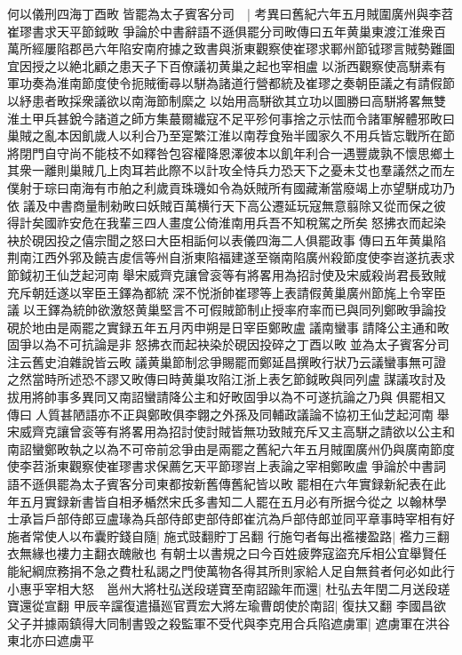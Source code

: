 何以儀刑四海丁酉畋皆罷為太子賓客分司　|{
	考異曰舊紀六年五月賊圍廣州與李苕崔璆書求天平節鉞畋爭論於中書辭語不遜俱罷分司畋傳曰五年黄巢東渡江淮衆百萬所經屢陷郡邑六年陷安南府據之致書與浙東觀察使崔璆求鄆州節钺璆言賊勢難圖宜因授之以絶北顧之患天子下百僚議初黄巢之起也宰相盧以浙西觀察使高駢素有軍功奏為淮南節度使令扼賊衝尋以駢為諸道行營都統及崔璆之奏朝臣議之有請假節以紓患者畋採衆議欲以南海節制縻之以始用高駢欲其立功以圖勝曰高駢將畧無雙淮土甲兵甚銳今諸道之師方集蕞爾纎寇不足平殄何事捨之示怯而令諸軍解體邪畋曰巢賊之亂本因飢歲人以利合乃至寔繁江淮以南荐食殆半國家久不用兵皆忘戰所在節將閉門自守尚不能枝不如釋咎包容權降恩澤彼本以飢年利合一遇豐歲孰不懷思鄉土其衆一離則巢賊几上肉耳若此際不以計攻全恃兵力恐天下之憂未艾也羣議然之而左僕射于琮曰南海有市舶之利歲貢珠璣如令為妖賊所有國藏漸當廢竭上亦望駢成功乃依議及中書商量制勑畋曰妖賊百萬横行天下高公遷延玩寇無意翦除又從而保之彼得計矣國祚安危在我輩三四人畫度公倚淮南用兵吾不知稅駕之所矣怒拂衣而起染袂於硯因投之僖宗聞之怒曰大臣相詬何以表儀四海二人俱罷政事傳曰五年黄巢陷荆南江西外郛及饒吉䖍信等州自浙東陷福建遂至嶺南陷廣州殺節度使李岧遂抗表求節鉞初王仙芝起河南舉宋威齊克讓曾衮等有將畧用為招討使及宋威殺尚君長致賊充斥朝廷遂以宰臣王鐸為都統深不悦浙帥崔璆等上表請假黄巢廣州節旄上令宰臣議以王鐸為統帥欲激怒黄巢堅言不可假賊節制止授率府率而已與同列鄭畋爭論投硯於地由是兩罷之實録五年五月丙申朔是日宰臣鄭畋盧議南蠻事請降公主通和畋固爭以為不可抗論是非怒拂衣而起袂染於硯因投碎之丁酉以畋並為太子賓客分司注云舊史洎雜說皆云畋議黄巢節制忿爭賜罷而鄭延昌撰畋行狀乃云議蠻事無可證之然當時所述恐不謬又畋傳曰時黄巢攻陷江浙上表乞節鉞畋與同列盧謀議攻討及拔用將帥事多異同又南詔蠻請降公主和好畋固爭以為不可遂抗論之乃與俱罷相又傳曰人質甚陋語亦不正與鄭畋俱李翺之外孫及同輔政議論不協初王仙芝起河南舉宋威齊克讓曾衮等有將畧用為招討使討賊皆無功致賊充斥又主高駢之請欲以公主和南詔蠻鄭畋執之以為不可帝前忿爭由是兩罷之舊紀六年五月賊圍廣州仍與廣南節度使李苕浙東觀察使崔璆書求保薦乞天平節璆岧上表論之宰相鄭畋盧爭論於中書詞語不遜俱罷為太子賓客分司東都按新舊傳舊紀皆以畋罷相在六年實録新紀表在此年五月實録新書皆自相矛楯然宋氏多書知二人罷在五月必有所据今從之}
以翰林學士承旨戶部侍郎豆盧瑑為兵部侍郎吏部侍郎崔沆為戶部侍郎並同平章事時宰相有好施者常使人以布囊貯錢自隨|{
	施式豉翻貯丁呂翻}
行施匄者每出襤褸盈路|{
	襤力三翻衣無緣也褸力主翻衣醜敝也}
有朝士以書規之曰今百姓疲弊寇盜充斥相公宜舉賢任能紀綱庶務捐不急之費杜私謁之門使萬物各得其所則家給人足自無貧者何必如此行小惠乎宰相大怒　邕州大將杜弘送段瑳寶至南詔踰年而還|{
	杜弘去年閏二月送段瑳寶還從宣翻}
甲辰辛讜復遣攝廵官賈宏大將左瑜曹朗使於南詔|{
	復扶又翻}
李國昌欲父子并據兩鎮得大同制書毁之殺監軍不受代與李克用合兵陷遮虜軍|{
	遮虜軍在洪谷東北亦曰遮虜平}
